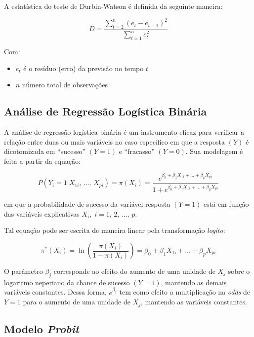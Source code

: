 \documentclass[
  portuguese,
]{estat/estat}
\begin{document}
A estatística do teste de Durbin-Watson é definida da seguinte maneira:

\[
D = \frac{\sum_{t=2}^{n} (e_t - e_{t-1})^2}{\sum_{t=1}^{n} e_t^2}
\]

Com:

\begin{itemize}
    \item $e_t$ é o resíduo (erro) da previsão no tempo $t$
    \item $n$ número total de observações
\end{itemize}

\subsection{Análise de Regressão Logística
Binária}\label{anuxe1lise-de-regressuxe3o-loguxedstica-binuxe1ria}

A análise de regressão logística binária é um instrumento eficaz para
verificar a relação entre duas ou mais variáveis no caso específico em
que a resposta \((Y)\) é dicotomizada em ``sucesso'' \((Y=1)\) e
``fracasso'' \((Y=0)\). Sua modelagem é feita a partir da equação:

\[
P(Y_i = 1|X_{1i}, \, \ldots , \, X_{pi}) = \pi(X_i)= \frac{e^{\beta_0 + \beta_1 X_{1i} + \ldots + \beta_p X_{pi}}}{1 + e^{\beta_0 + \beta_1 X_{1i} + \ldots + \beta_p X_{pi}}}
\]

em que a probabilidade de sucesso da variável resposta \((Y=1)\) está em
função das variáveis explicativas \(X_i,\; i=1,\, 2, \, \ldots , \,p\).

Tal equação pode ser escrita de maneira linear pela transformação
\emph{logito}:

\[
\pi^*(X_i)=\ln\left(\frac{\pi(X_i)}{1-\pi(X_i)}\right)=\beta_0+\beta_1X_{1i}+ \ldots +\beta_pX_{pi}
\]

O parâmetro \(\beta_{j}\) corresponde ao efeito do aumento de uma
unidade de \(X_{j}\) sobre o logaritmo neperiano da chance de sucesso
\((Y=1)\), mantendo as demais variáveis constantes. Dessa forma,
\(\displaystyle e^{\beta_j}\) tem como efeito a multiplicação na
\emph{odds} de \(Y=1\) para o aumento de uma unidade de \(X_{j}\),
mantendo as variáveis constantes.

\subsection{\texorpdfstring{Modelo
\emph{Probit}}{Modelo Probit}}\label{modelo-probit}
\end{document}
